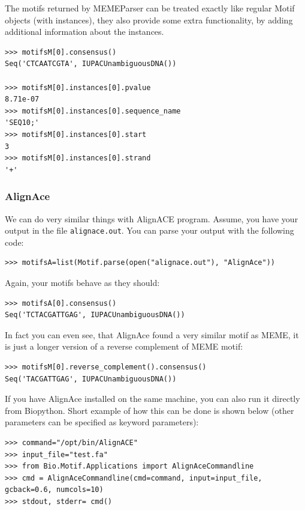\documentclass{report}
\begin{document}
The motifs returned by MEMEParser can be treated exactly like regular
Motif objects (with instances), they also provide some extra
functionality, by adding additional information about the instances. 

\begin{verbatim}
>>> motifsM[0].consensus()
Seq('CTCAATCGTA', IUPACUnambiguousDNA())

>>> motifsM[0].instances[0].pvalue
8.71e-07
>>> motifsM[0].instances[0].sequence_name
'SEQ10;'
>>> motifsM[0].instances[0].start
3
>>> motifsM[0].instances[0].strand
'+'
\end{verbatim}


\subsubsection{AlignAce}

We can do very similar things with AlignACE program. Assume, you have
your output in the file \verb|alignace.out|. You can parse your output
with the following code:

\begin{verbatim}
>>> motifsA=list(Motif.parse(open("alignace.out"), "AlignAce"))
\end{verbatim}

Again, your motifs behave as they should:
\begin{verbatim}
>>> motifsA[0].consensus()
Seq('TCTACGATTGAG', IUPACUnambiguousDNA())
\end{verbatim}

In fact you can even see, that AlignAce found a very similar motif as
MEME, it is just a longer version of a reverse complement of MEME
motif:
\begin{verbatim}
>>> motifsM[0].reverse_complement().consensus()
Seq('TACGATTGAG', IUPACUnambiguousDNA())
\end{verbatim}

If you have AlignAce installed on the same machine, you can also run
it directly from Biopython. Short example of how this can be done is
shown below (other parameters can be specified as keyword parameters):

\begin{verbatim}
>>> command="/opt/bin/AlignACE"
>>> input_file="test.fa"
>>> from Bio.Motif.Applications import AlignAceCommandline
>>> cmd = AlignAceCommandline(cmd=command, input=input_file, gcback=0.6, numcols=10)
>>> stdout, stderr= cmd()
\end{verbatim}
\end{document}

